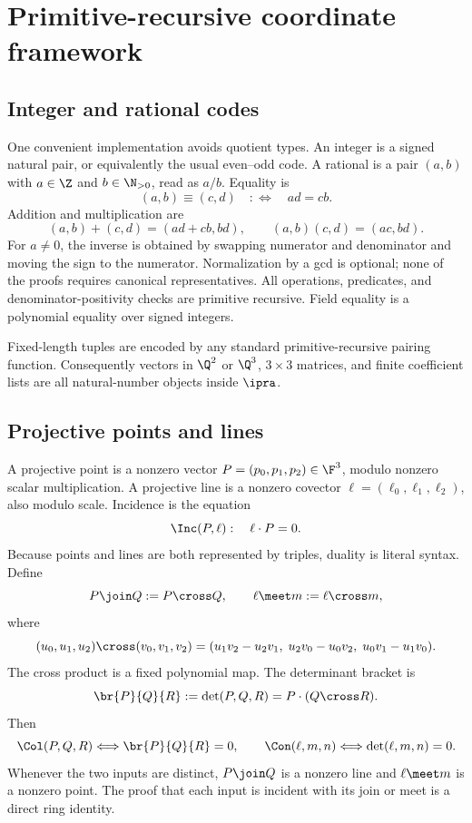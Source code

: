 \section{Primitive-recursive coordinate framework}

\subsection{Integer and rational codes}

One convenient implementation avoids quotient types.  An integer is a signed natural pair, or equivalently the usual even--odd code.  A rational is a pair $(a,b)$ with $a\in\Z$ and $b\in\N_{>0}$, read as $a/b$.  Equality is
\[
(a,b)\equiv(c,d)\quad:\Longleftrightarrow\quad ad=cb.
\]
Addition and multiplication are
\[
(a,b)+(c,d)=(ad+cb,bd),\qquad (a,b)(c,d)=(ac,bd).
\]
For $a\ne0$, the inverse is obtained by swapping numerator and denominator and moving the sign to the numerator.  Normalization by a gcd is optional; none of the proofs requires canonical representatives.  All operations, predicates, and denominator-positivity checks are primitive recursive.  Field equality is a polynomial equality over signed integers.

Fixed-length tuples are encoded by any standard primitive-recursive pairing function.  Consequently vectors in $\Q^2$ or $\Q^3$, $3\times3$ matrices, and finite coefficient lists are all natural-number objects inside $\ipra$.

\subsection{Projective points and lines}

A projective point is a nonzero vector $P=(p_0,p_1,p_2)\in\F^3$, modulo nonzero scalar multiplication.  A projective line is a nonzero covector $\ell=(\ell_0,\ell_1,\ell_2)$, also modulo scale.  Incidence is the equation
\[
\Inc(P,\ell):\quad \ell\cdot P=0.
\]
Because points and lines are both represented by triples, duality is literal syntax.  Define
\[
P\join Q:=P\cross Q,\qquad \ell\meet m:=\ell\cross m,
\]
where
\[
(u_0,u_1,u_2)\cross(v_0,v_1,v_2)
=(u_1v_2-u_2v_1,\;u_2v_0-u_0v_2,\;u_0v_1-u_1v_0).
\]
The cross product is a fixed polynomial map.  The determinant bracket is
\[
\br{P}{Q}{R}:=\det(P,Q,R)=P\cdot(Q\cross R).
\]
Then
\[
\Col(P,Q,R)\Longleftrightarrow\br{P}{Q}{R}=0,
\qquad
\Con(\ell,m,n)\Longleftrightarrow\det(\ell,m,n)=0.
\]
Whenever the two inputs are distinct, $P\join Q$ is a nonzero line and $\ell\meet m$ is a nonzero point.  The proof that each input is incident with its join or meet is a direct ring identity.

